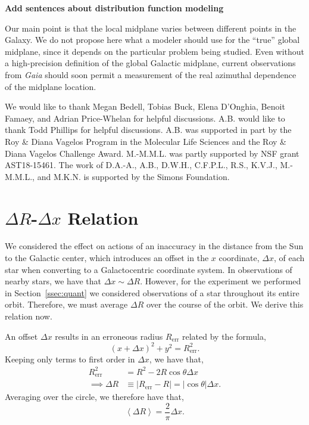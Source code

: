 \documentclass[twocolumn]{aastex62}
\newcommand{\abs}[1]{\left| #1 \right|}
\newcommand{\avg}[1]{\left< #1 \right>}
\newcommand{\beq}{\begin{equation}}
\newcommand{\eeq}{\end{equation}}
\begin{document}
{\bf Add sentences about distribution function modeling}

Our main point is that the local midplane varies between different points in
the Galaxy. We do
not propose here what a modeler should use for the ``true'' global midplane,
since it depends on the particular problem being studied. Even without a
high-precision definition of the global Galactic midplane, current
observations from {\em Gaia} should soon permit a measurement of the real
azimuthal dependence of the midplane location.

\acknowledgments
We would like to thank Megan Bedell, Tobias Buck, Elena D'Onghia, Benoit
Famaey, and Adrian Price-Whelan for helpful discussions. A.B. would like to
thank Todd Phillips for helpful discussions. A.B. was supported in part by the
Roy \& Diana Vagelos Program in the Molecular Life Sciences and the Roy \&
Diana Vagelos Challenge Award. M.-M.M.L. was partly supported by NSF grant
AST18-15461. The work of D.A.-A., A.B., D.W.H., C.F.P.L., R.S., K.V.J.,
M.-M.M.L., and M.K.N. is supported by the Simons Foundation.

\appendix
\section{$\Delta R$-$\Delta x$ Relation} \label{app:deltax}
We considered the effect on actions of an inaccuracy in the distance from the
Sun to the Galactic center, which introduces an offset in the $x$ coordinate,
$\Delta x$, of each star when converting to a Galactocentric coordinate
system. In observations of nearby stars, we have that $\Delta x \sim \Delta
R$. However, for the experiment we performed in Section~\ref{ssec:quant} we
considered observations of a star throughout its entire orbit. Therefore, we
must average $\Delta R$ over the course of the orbit. We derive this relation
now.

An offset $\Delta x$ results in an erroneous radius $R_{\text{err}}$ related by
the formula,
\beq
(x+\Delta x)^2 + y^2 = R_{\text{err}}^2\text{.}
\eeq
Keeping only terms to first order in $\Delta x$, we have that,
\beq
\begin{split}
R_{\text{err}}^2 &= R^2 - 2 R \cos{\theta} \Delta x \\
\implies \Delta R &\equiv \abs{R_{\text{err}} - R} = \abs{\cos{\theta}} \Delta x\text{.}
\end{split}
\eeq
Averaging over the circle, we therefore have that,
\beq
\avg{\Delta R} = \frac{2}{\pi} \Delta x\text{.}
\eeq
\end{document}
